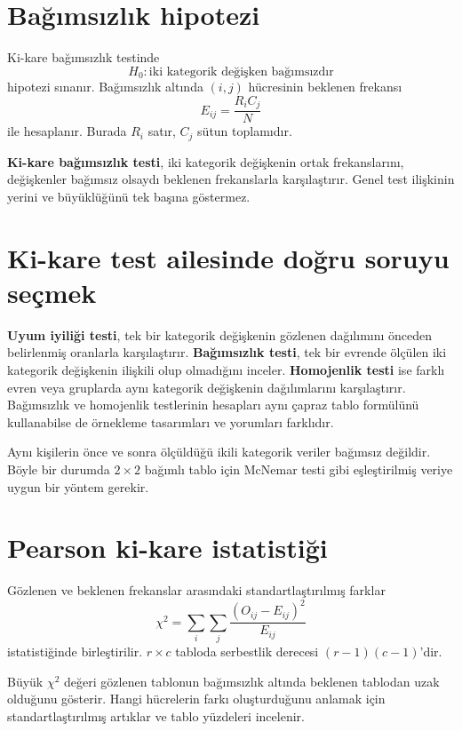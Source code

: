 \section{Bağımsızlık hipotezi}

Ki-kare bağımsızlık testinde
\[
H_0:\text{iki kategorik değişken bağımsızdır}
\]
hipotezi sınanır. Bağımsızlık altında $(i,j)$ hücresinin beklenen frekansı
\[
E_{ij}=\frac{R_iC_j}{N}
\]
ile hesaplanır. Burada $R_i$ satır, $C_j$ sütun toplamıdır.

\begin{definitionbox}
\textbf{Ki-kare bağımsızlık testi}, iki kategorik değişkenin ortak
frekanslarını, değişkenler bağımsız olsaydı beklenen frekanslarla karşılaştırır.
Genel test ilişkinin yerini ve büyüklüğünü tek başına göstermez.
\end{definitionbox}

\section{Ki-kare test ailesinde doğru soruyu seçmek}
\label{sec:chi-choice}

\textbf{Uyum iyiliği testi}, tek bir kategorik değişkenin gözlenen
dağılımını önceden belirlenmiş oranlarla karşılaştırır. \textbf{Bağımsızlık
testi}, tek bir evrende ölçülen iki kategorik değişkenin ilişkili olup
olmadığını inceler. \textbf{Homojenlik testi} ise farklı evren veya gruplarda
aynı kategorik değişkenin dağılımlarını karşılaştırır. Bağımsızlık ve
homojenlik testlerinin hesapları aynı çapraz tablo formülünü kullanabilse de
örnekleme tasarımları ve yorumları farklıdır.

Aynı kişilerin önce ve sonra ölçüldüğü ikili kategorik veriler bağımsız
değildir. Böyle bir durumda $2\times2$ bağımlı tablo için McNemar testi gibi
eşleştirilmiş veriye uygun bir yöntem gerekir.

\section{Pearson ki-kare istatistiği}
\label{sec:pearson-chi}

Gözlenen ve beklenen frekanslar arasındaki standartlaştırılmış farklar
\[
\chi^2=\sum_i\sum_j\frac{(O_{ij}-E_{ij})^2}{E_{ij}}
\]
istatistiğinde birleştirilir. $r\times c$ tabloda serbestlik derecesi
$(r-1)(c-1)$'dir.

Büyük $\chi^2$ değeri gözlenen tablonun bağımsızlık altında beklenen tablodan
uzak olduğunu gösterir. Hangi hücrelerin farkı oluşturduğunu anlamak için
standartlaştırılmış artıklar ve tablo yüzdeleri incelenir.

